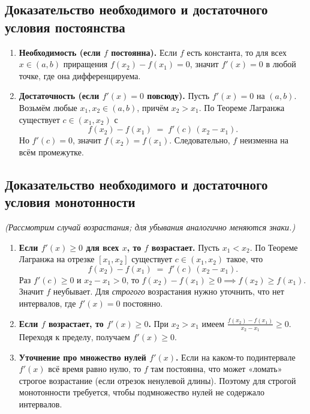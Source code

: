\subsection*{Доказательство необходимого и достаточного условия постоянства}

\begin{enumerate}
  \item \textbf{Необходимость (если $f$ постоянна).}  
  Если $f$ есть константа, то для всех $x\in(a,b)$ приращения $f(x_2)-f(x_1)=0$, значит $f'(x)=0$ в любой точке, где она дифференцируема.
  \item \textbf{Достаточность (если $f'(x)=0$ повсюду).}  
  Пусть $f'(x)=0$ на $(a,b)$. Возьмём любые $x_1,x_2\in(a,b)$, причём $x_2>x_1$. По Теореме Лагранжа существует $c\in(x_1,x_2)$ с
  \[
    f(x_2)-f(x_1) \;=\; f'(c)\,(x_2-x_1).
  \]
  Но $f'(c)=0$, значит $f(x_2)=f(x_1)$. Следовательно, $f$ неизменна на всём промежутке.
\end{enumerate}

\subsection*{Доказательство необходимого и достаточного условия монотонности}

\emph{(Рассмотрим случай возрастания; для убывания аналогично меняются знаки.)}

\begin{enumerate}
  \item \textbf{Если $f'(x)\ge 0$ для всех $x$, то $f$ возрастает.}  
  Пусть $x_1<x_2$. По Теореме Лагранжа на отрезке $[x_1,x_2]$ существует $c\in(x_1,x_2)$ такое, что
  \[
    f(x_2)-f(x_1) \;=\; f'(c)\,(x_2 - x_1).
  \]
  Раз $f'(c)\ge 0$ и $x_2-x_1>0$, то $f(x_2)-f(x_1)\ge 0\implies f(x_2)\ge f(x_1)$. Значит $f$ неубывает. Для \emph{строгого} возрастания нужно уточнить, что нет интервалов, где $f'(x)=0$ постоянно.
  \item \textbf{Если $f$ возрастает, то $f'(x)\ge0$.}  
  При $x_2>x_1$ имеем \(\tfrac{f(x_2)-f(x_1)}{x_2-x_1}\ge 0\). Переходя к пределу, получаем $f'(x)\ge0$.
  \item \textbf{Уточнение про множество нулей $f'(x)$.}  
  Если на каком-то подинтервале $f'(x)$ всё время равно нулю, то $f$ там постоянна, что может «ломать» строгое возрастание (если отрезок ненулевой длины). Поэтому для строгой монотонности требуется, чтобы подмножество нулей не содержало интервалов.
\end{enumerate}

\medskip


